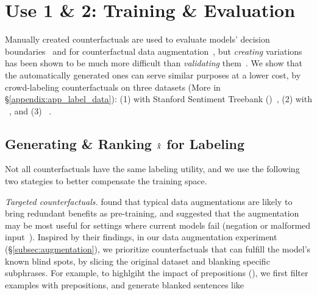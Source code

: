 \section{Use 1 \& 2: Training \& Evaluation}
\label{sec:app_label}

Manually created counterfactuals are used to evaluate models' decision boundaries~\cite{gardner2020contrast} and for counterfactual data augmentation~\cite{kaushik2019learning}, but \emph{creating} variations has been shown to be much more difficult than \emph{validating} them~\cite{ribeiro2018sear}.
We show that the automatically generated ones can serve similar purposes at a lower cost, by crowd-labeling counterfactuals on three datasets (More in \S\ref{appendix:app_label_data}): 
(1) \sst with Stanford Sentiment Treebank (\dsst)~\cite{socher2013recursive},
(2) \nli with \dnli~\cite{bowman-etal-2015-large}, and 
(3) \dqqp~\cite{wang2018glue}.

\subsection{Generating \& Ranking $\hat{x}$ for Labeling}
\label{subsec:gen_counterfactual_for_labeling}

Not all counterfactuals have the same labeling utility, and we use the following two stategies to better compensate the training space.

\emph{Targeted counterfactuals.}
\citet{longpre2020effective} found that typical data augmentations are likely to bring redundant benefits as pre-training, and suggested that the augmentation may be most useful for settings where current models fail (\eg negation or malformed input~\cite{rogers2020primer,ettinger2020bert}).
Inspired by their findings, in our data augmentation experiment (\S\ref{subsec:augmentation}), we prioritize counterfactuals that can fulfill the model's known blind spots, by slicing the original dataset and blanking specific subphrases.  
For example, to highlgiht the impact of prepositions (\eg {}), we first filter examples with prepositions, and generate blanked sentences like 

